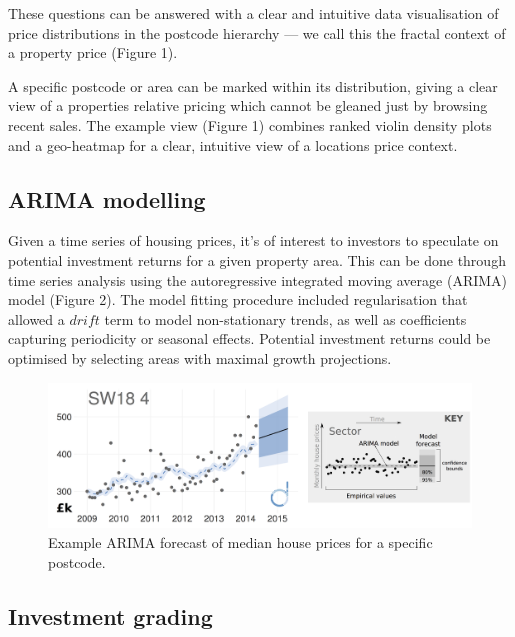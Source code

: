 \documentclass[
10pt, %
a4paper, %
oneside, %
headinclude,footinclude, %
BCOR5mm, %
]{scrartcl}
\begin{document}

These questions can be answered with a clear and intuitive data
visualisation of price distributions in the postcode hierarchy --- we
call this the fractal context of a property price (Figure 1).

A specific postcode or area can be marked within its distribution,
giving a clear view of a properties relative pricing which cannot be
gleaned just by browsing recent sales. The example view (Figure 1)
combines ranked violin density plots and a geo-heatmap for a clear,
intuitive view of a locations price context.

\vspace{-.5em}
\subsection*{ARIMA modelling}

Given a time series of housing prices, it's of interest to investors
to speculate on potential investment returns for a given property
area. This can be done through time series analysis using the
autoregressive integrated moving average (ARIMA) model (Figure 2). The
model fitting procedure included regularisation that allowed a $drift$
term to model non-stationary trends, as well as coefficients capturing
periodicity or seasonal effects. Potential investment returns could be
optimised by selecting areas with
maximal growth projections. \\

\begin{figure}[h]
\begin{center}
\includegraphics[width=.9\textwidth]{Figures/arima.png}
\caption{Example ARIMA forecast of median house prices for a specific postcode.}
\end{center}
\end{figure}

\vspace{-2em}
\subsection*{Investment grading}
\end{document}
